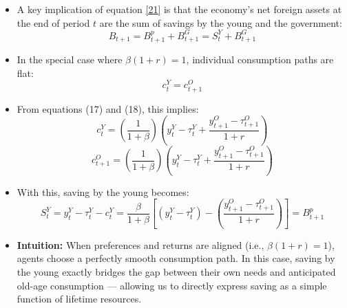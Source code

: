 \documentclass[12pt]{article}
\begin{document}
\begin{itemize}
\item A key implication of equation \eqref{21} is that the economy’s net foreign assets at the end of period \( t \) are the sum of savings by the young and the government:
\[
B_{t+1} = B_{t+1}^p + B_{t+1}^G = S_t^Y + B_{t+1}^G
\]

\item In the special case where \( \beta (1 + r) = 1 \), individual consumption paths are flat:
\[
c_t^Y = c_{t+1}^O
\]

\item From equations (17) and (18), this implies:
\[
c_t^Y = \left( \frac{1}{1 + \beta} \right) \left( y_t^Y - \tau_t^Y + \frac{y_{t+1}^O - \tau_{t+1}^O}{1 + r} \right)
\]
\[
c_{t+1}^O = \left( \frac{1}{1 + \beta} \right) \left( y_t^Y - \tau_t^Y + \frac{y_{t+1}^O - \tau_{t+1}^O}{1 + r} \right)
\]

\item With this, saving by the young becomes:
\[
S_t^Y = y_t^Y - \tau_t^Y - c_t^Y = \frac{\beta}{1 + \beta} \left[ \left( y_t^Y - \tau_t^Y \right) - \left( \frac{y_{t+1}^O - \tau_{t+1}^O}{1 + r} \right) \right] = B_{t+1}^p \tag{23}
\]

\item \textbf{Intuition:} When preferences and returns are aligned (i.e., \( \beta(1 + r) = 1 \)), agents choose a perfectly smooth consumption path. In this case, saving by the young exactly bridges the gap between their own needs and anticipated old-age consumption — allowing us to directly express saving as a simple function of lifetime resources.
\end{itemize}
\end{document}
